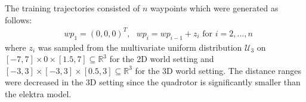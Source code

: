 The training trajectories consisted of $n$ waypoints which were generated as follows: 
\begin{align}
\label{equ:trajectory_generation}
    & wp_1 = (0,0,0)^T, \text{  }  wp_i = wp_{i-1} + z_i \text{ for } i = 2,...,n 
\end{align}
where $z_i$ was sampled from the multivariate uniform distribution $\mathcal{U}_3$ on $[-7,7]\times 0 \times [1.5,7] \subseteq \mathbb{R}^3$ for the 2D world setting and  $[-3,3]\times [-3,3] \times [0.5,3] \subseteq \mathbb{R}^3$ for the 3D world setting. The distance ranges were decreased in the 3D setting since the quadrotor is significantly smaller than the elektra model.